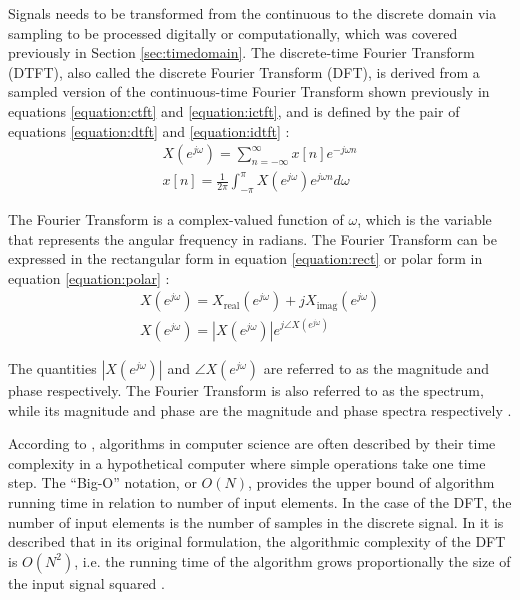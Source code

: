 \documentclass[report.tex]{subfiles}
\begin{document}
Signals needs to be transformed from the continuous to the discrete domain via sampling to be processed digitally or computationally, which was covered previously in Section \ref{sec:timedomain}. The discrete-time Fourier Transform (DTFT), also called the discrete Fourier Transform (DFT), is derived from a sampled version of the continuous-time Fourier Transform shown previously in equations \eqref{equation:ctft} and \eqref{equation:ictft}, and is defined by the pair of equations \eqref{equation:dtft} and \eqref{equation:idtft} \parencite[289]{melbook}:
\begin{align}
	X(e^{j\omega}) = \sum_{n = -\infty}^{\infty}{x[n]e^{-j\omega n}} \tag{3}\label{equation:dtft} \\
	x[n] = \frac{1}{2\pi}\int_{-\pi}^{\pi}{X(e^{j\omega})e^{j\omega n}\mathit{d\omega}} \tag{4}\label{equation:idtft}
\end{align}

The Fourier Transform is a complex-valued function of $\omega$, which is the variable that represents the angular frequency in radians. The Fourier Transform can be expressed in the rectangular form in equation \eqref{equation:rect} or polar form in equation \eqref{equation:polar} \parencite[49]{discretebook}:
\begin{align}
	X(e^{j\omega}) = X_{\text{real}}(e^{j\omega}) + j X_{\text{imag}}(e^{j\omega}) \tag{5}\label{equation:rect} \\
	X(e^{j\omega}) = |X(e^{j\omega})|e^{j\angle X(e^{j\omega})} \tag{6}\label{equation:polar}
\end{align}

The quantities $|X(e^{j\omega})|$ and $\angle X(e^{j\omega})$ are referred to as the magnitude and phase respectively. The Fourier Transform is also referred to as the spectrum, while its magnitude and phase are the magnitude and phase spectra respectively \parencite{discretebook}.

According to \textcite{skiena}, algorithms in computer science are often described by their time complexity in a hypothetical computer where simple operations take one time step. The ``Big-O'' notation, or $O(N)$, provides the upper bound of algorithm running time in relation to number of input elements. In the case of the DFT, the number of input elements is the number of samples in the discrete signal. In \textcite[Chapter~9]{discretebook} it is described that in its original formulation, the algorithmic complexity of the DFT is $O(N^{2})$, i.e. the running time of the algorithm grows proportionally the size of the input signal squared \parencite{skiena}. 
\end{document}
